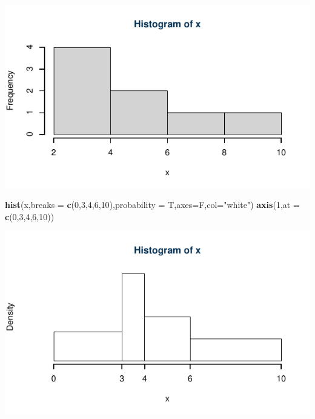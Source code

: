 \documentclass[
  11pt,
]{book}
\newenvironment{Shaded}{\begin{snugshade}}{\end{snugshade}}
\newcommand{\AttributeTok}[1]{\textcolor[rgb]{0.13,0.29,0.53}{#1}}
\newcommand{\DecValTok}[1]{\textcolor[rgb]{0.00,0.00,0.81}{#1}}
\newcommand{\FunctionTok}[1]{\textcolor[rgb]{0.13,0.29,0.53}{\textbf{#1}}}
\newcommand{\NormalTok}[1]{#1}
\newcommand{\StringTok}[1]{\textcolor[rgb]{0.31,0.60,0.02}{#1}}
\theoremstyle{mytheoremstyle}
\theoremstyle{mydefstyle}
\begin{document}
\begin{center}\includegraphics{Appunti_di_Statistica_2025_files/figure-latex/24-Libro-27,-1} \end{center}

\begin{Shaded}
\begin{Highlighting}[]
\FunctionTok{hist}\NormalTok{(x,}\AttributeTok{breaks =} \FunctionTok{c}\NormalTok{(}\DecValTok{0}\NormalTok{,}\DecValTok{3}\NormalTok{,}\DecValTok{4}\NormalTok{,}\DecValTok{6}\NormalTok{,}\DecValTok{10}\NormalTok{),}\AttributeTok{probability =}\NormalTok{ T,}\AttributeTok{axes=}\NormalTok{F,}\AttributeTok{col=}\StringTok{"white"}\NormalTok{)}
\FunctionTok{axis}\NormalTok{(}\DecValTok{1}\NormalTok{,}\AttributeTok{at =} \FunctionTok{c}\NormalTok{(}\DecValTok{0}\NormalTok{,}\DecValTok{3}\NormalTok{,}\DecValTok{4}\NormalTok{,}\DecValTok{6}\NormalTok{,}\DecValTok{10}\NormalTok{))}
\end{Highlighting}
\end{Shaded}

\begin{center}\includegraphics{Appunti_di_Statistica_2025_files/figure-latex/24-Libro-27,-2} \end{center}
\end{document}
